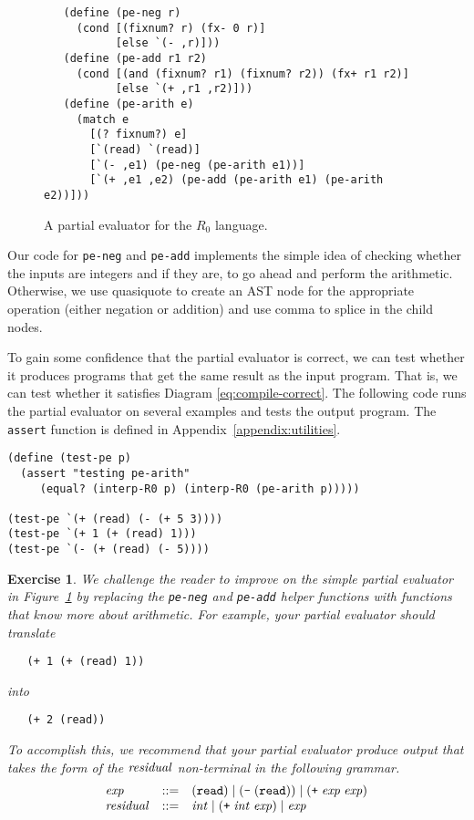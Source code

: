 \documentclass[11pt]{book}
\newtheorem{exercise}[theorem]{Exercise}
\begin{document}
\begin{figure}[tbp]
\begin{lstlisting}
   (define (pe-neg r)
     (cond [(fixnum? r) (fx- 0 r)]
           [else `(- ,r)]))
   (define (pe-add r1 r2)
     (cond [(and (fixnum? r1) (fixnum? r2)) (fx+ r1 r2)]
           [else `(+ ,r1 ,r2)]))
   (define (pe-arith e)
     (match e
       [(? fixnum?) e]
       [`(read) `(read)]
       [`(- ,e1) (pe-neg (pe-arith e1))]
       [`(+ ,e1 ,e2) (pe-add (pe-arith e1) (pe-arith e2))]))   
\end{lstlisting}
\caption{A partial evaluator for the $R_0$ language.}
\label{fig:pe-arith}
\end{figure}

Our code for \texttt{pe-neg} and \texttt{pe-add} implements the simple
idea of checking whether the inputs are integers and if they are, to
go ahead and perform the arithmetic.  Otherwise, we use quasiquote to
create an AST node for the appropriate operation (either negation or
addition) and use comma to splice in the child nodes.

To gain some confidence that the partial evaluator is correct, we can
test whether it produces programs that get the same result as the
input program. That is, we can test whether it satisfies Diagram
\eqref{eq:compile-correct}. The following code runs the partial
evaluator on several examples and tests the output program.  The
\texttt{assert} function is defined in Appendix~\ref{appendix:utilities}.
\begin{lstlisting}
(define (test-pe p)
  (assert "testing pe-arith"
     (equal? (interp-R0 p) (interp-R0 (pe-arith p)))))

(test-pe `(+ (read) (- (+ 5 3))))
(test-pe `(+ 1 (+ (read) 1)))
(test-pe `(- (+ (read) (- 5))))
\end{lstlisting}

\begin{exercise}
\normalfont %
We challenge the reader to improve on the simple partial evaluator in
Figure~\ref{fig:pe-arith} by replacing the \texttt{pe-neg} and
\texttt{pe-add} helper functions with functions that know more about
arithmetic. For example, your partial evaluator should translate
\begin{lstlisting}
   (+ 1 (+ (read) 1))
\end{lstlisting}
into
\begin{lstlisting}
   (+ 2 (read))
\end{lstlisting}
To accomplish this, we recommend that your partial evaluator produce
output that takes the form of the $\mathit{residual}$ non-terminal in the
following grammar.
\[
\begin{array}{lcl}
\mathit{exp} &::=& (\texttt{read}) \mid (\texttt{-} \;(\texttt{read})) \mid (\texttt{+} \; \mathit{exp} \; \mathit{exp})\\
\mathit{residual} &::=& \mathit{int} \mid (\texttt{+}\; \mathit{int}\; \mathit{exp}) \mid \mathit{exp}
\end{array}
\]
\end{exercise}
\end{document}
